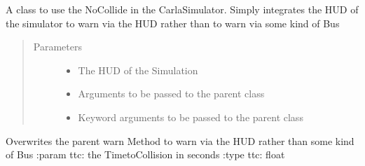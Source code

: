\documentclass[letterpaper,10pt,english]{sphinxmanual}
\begin{document}
\begin{fulllineitems}
\label{\detokenize{sim_interfaces:lib.sim_interfaces.SimNoCollide}}
A class to use the NoCollide in the Carla\sphinxhyphen{}Simulator. Simply integrates the HUD of the simulator to warn via the
HUD rather than to warn via some kind of Bus
\begin{quote}\begin{description}
\item[{Parameters}] \leavevmode\begin{itemize}
\item {} 
 \textendash{} The HUD of the Simulation

\item {} 
 \textendash{} Arguments to be passed to the parent class

\item {} 
 \textendash{} Keyword arguments to be passed to the parent class

\end{itemize}

\end{description}\end{quote}

\begin{fulllineitems}
\label{\detokenize{sim_interfaces:lib.sim_interfaces.SimNoCollide.warn}}
Overwrites the parent warn Method to warn via the HUD rather than some kind of Bus
:param ttc: the Time\sphinxhyphen{}to\sphinxhyphen{}Collision in seconds
:type ttc: float

\end{fulllineitems}


\end{fulllineitems}

\end{document}
